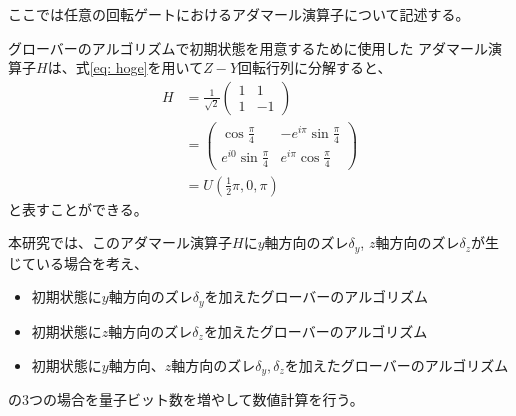 \begin{comment}
    ここでは任意の回転ゲートにおけるアダマール演算子について記述する。
\end{comment}
ここでは任意の回転ゲートにおけるアダマール演算子について記述する。

グローバーのアルゴリズムで初期状態を用意するために使用した
アダマール演算子$H$は、式\ref{eq: hoge}を用いて$Z-Y$回転行列に分解すると、
\begin{equation}
    \begin{split}
        H &= \frac{1}{\sqrt{2}} \begin{pmatrix}
            1 & 1 \\
            1 & -1
        \end{pmatrix} \\
        &= \begin{pmatrix}
            \cos{\frac{\pi}{4}} & -e^{i\pi} \sin{\frac{\pi}{4}} \\
            e^{i0} \sin{\frac{\pi}{4}} & e^{i \pi} \cos{\frac{\pi}{4}}
        \end{pmatrix} \\
        &= U(\frac{1}{2}\pi, 0, \pi)
    \end{split}
\end{equation}
と表すことができる。

本研究では、このアダマール演算子$H$に$y$軸方向のズレ$\delta_y$, $z$軸方向のズレ$\delta_z$が生じている場合を考え、

\begin{itemize}
    \item 初期状態に$y$軸方向のズレ$\delta_y$を加えたグローバーのアルゴリズム
    \item 初期状態に$z$軸方向のズレ$\delta_z$を加えたグローバーのアルゴリズム
    \item 初期状態に$y$軸方向、$z$軸方向のズレ$\delta_y, \delta_z$を加えたグローバーのアルゴリズム
\end{itemize}

の3つの場合を量子ビット数を増やして数値計算を行う。


